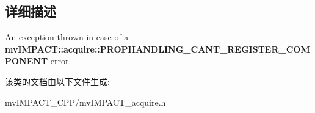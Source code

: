 \subsection{详细描述}
An exception thrown in case of a {\bfseries mv\+I\+M\+P\+A\+C\+T\+::acquire\+::\+P\+R\+O\+P\+H\+A\+N\+D\+L\+I\+N\+G\+\_\+\+C\+A\+N\+T\+\_\+\+R\+E\+G\+I\+S\+T\+E\+R\+\_\+\+C\+O\+M\+P\+O\+N\+E\+N\+T} error. 

该类的文档由以下文件生成\+:\begin{DoxyCompactItemize}
\item 
mv\+I\+M\+P\+A\+C\+T\+\_\+\+C\+P\+P/mv\+I\+M\+P\+A\+C\+T\+\_\+acquire.\+h\end{DoxyCompactItemize}
